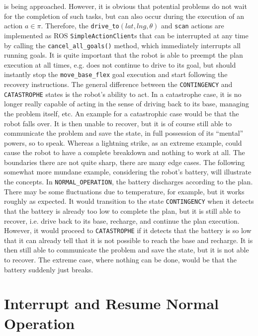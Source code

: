\documentclass[english, master, utf8]{base/thesis_KBS}
\newcommand{\code}[1]{\colorbox{light-gray}{\texttt{#1}}}
\begin{document}
is being approached. However, it is obvious that potential problems do not wait for the completion of such tasks, but can also occur during the execution of an action $a \in \pi$.
Therefore, the \code{drive\_to$(lat, lng, \theta)$} and \code{scan} actions are implemented as ROS \code{SimpleActionClient}s that can be interrupted at any time
by calling the \code{cancel\_all\_goals()} method, which immediately interrupts all running goals. It is quite important that the robot is able to preempt the plan 
execution at all times, e.g. does not continue to drive to its goal, but should instantly stop the \code{move\_base\_flex} goal execution and start following the
recovery instructions.\newline
The general difference between the \code{CONTINGENCY} and \code{CATASTROPHE} states is the robot's ability to act. 
In a catastrophe case, it is no longer really capable of acting in the sense of driving back to its base, managing the problem itself, etc. 
An example for a catastrophic case would be that the robot falls over. It is then unable to recover, but it is of course still able to communicate the problem
and save the state, in full possession of its ``mental'' powers, so to speak. Whereas a lightning strike, as an extreme example, could cause the robot to have a 
complete breakdown and nothing to work at all. The boundaries there are not quite sharp, there are many edge cases.
The following somewhat more mundane example, considering the robot's battery, will illustrate the concepts.
In \code{NORMAL\_OPERATION}, the battery discharges according to the plan. There may be some fluctuations due to temperature, for example, but it works roughly as expected.
It would transition to the state \code{CONTINGENCY} when it detects that the battery is already too low to complete the plan, but it is still able to recover,
i.e. drive back to its base, recharge, and continue the plan execution. However, it would proceed to \code{CATASTROPHE} if it detects that the battery is so low
that it can already tell that it is not possible to reach the base and recharge. It is then still able to communicate the problem and save the state, but it is not able
to recover. The extreme case, where nothing can be done, would be that the battery suddenly just breaks.

\section{Interrupt and Resume Normal Operation}
\end{document}
